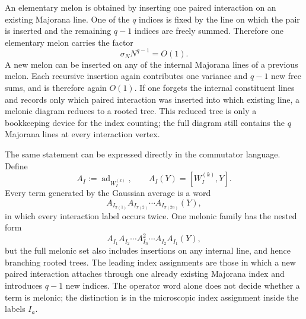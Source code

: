 \documentclass{article}
\theoremstyle{definition}
\begin{document}
An elementary melon is obtained by inserting one paired interaction on an existing Majorana line. One of the $q$ indices is fixed by the line on which the pair is inserted and the remaining $q-1$ indices are freely summed. Therefore one elementary melon carries the factor
\begin{equation}
    \sigma_N N^{q-1}=O(1).
    \label{eq:quenched_elementary_melon_counting}
\end{equation}
A new melon can be inserted on any of the internal Majorana lines of a previous melon. Each recursive insertion again contributes one variance and $q-1$ new free sums, and is therefore again $O(1)$. If one forgets the internal constituent lines and records only which paired interaction was inserted into which existing line, a melonic diagram reduces to a rooted tree. This reduced tree is only a bookkeeping device for the index counting; the full diagram still contains the $q$ Majorana lines at every interaction vertex.

The same statement can be expressed directly in the commutator language. Define
\begin{equation}
    A_I:=\operatorname{ad}_{W_I^{(k)}},
    \qquad
    A_I(Y)=[W_I^{(k)},Y].
\end{equation}
Every term generated by the Gaussian average is a word
\begin{equation}
    A_{I_{\pi(1)}}A_{I_{\pi(2)}}\cdots A_{I_{\pi(2n)}}(Y),
    \label{eq:quenched_commutator_word}
\end{equation}
in which every interaction label occurs twice. One melonic family has the nested form
\begin{equation}
    A_{I_1}A_{I_2}\cdots A_{I_n}^2\cdots A_{I_2}A_{I_1}(Y),
    \label{eq:quenched_nested_melon_word}
\end{equation}
but the full melonic set also includes insertions on any internal line, and hence branching rooted trees. The leading index assignments are those in which a new paired interaction attaches through one already existing Majorana index and introduces $q-1$ new indices. The operator word alone does not decide whether a term is melonic; the distinction is in the microscopic index assignment inside the labels $I_a$.
\end{document}
